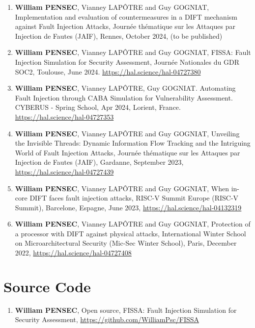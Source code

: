 \begin{enumerate}
    \item \textbf{William PENSEC}, Vianney LAPÔTRE and Guy GOGNIAT, Implementation and evaluation of countermeasures in a DIFT mechanism against Fault Injection Attacks, Journée thématique sur les Attaques par Injection de Fautes (JAIF), Rennes, October 2024, (to be published)
    \item \textbf{William PENSEC}, Vianney LAPÔTRE and Guy GOGNIAT, FISSA: Fault Injection Simulation for Security Assessment, Journée Nationales du GDR SOC2, Toulouse, June 2024. \url{https://hal.science/hal-04727380}
    \item \textbf{William PENSEC}, Vianney LAPÔTRE, Guy GOGNIAT. Automating Fault Injection through CABA Simulation for Vulnerability Assessment. CYBERUS - Spring School, Apr 2024, Lorient, France. \url{https://hal.science/hal-04727353}
    \item \textbf{William PENSEC}, Vianney LAPÔTRE and Guy GOGNIAT, Unveiling the Invisible Threads: Dynamic Information Flow Tracking and the Intriguing World of Fault Injection Attacks, Journée thématique sur les Attaques par Injection de Fautes (JAIF), Gardanne, September 2023, \url{https://hal.science/hal-04727439}
    \item \textbf{William PENSEC}, Vianney LAPÔTRE and Guy GOGNIAT, When in-core DIFT faces fault injection attacks, RISC-V Summit Europe (RISC-V Summit), Barcelone, Espagne, June 2023, \url{https://hal.science/hal-04132319}
    \item \textbf{William PENSEC}, Vianney LAPÔTRE and Guy GOGNIAT, Protection of a processor with DIFT against physical attacks, International Winter School on Microarchitectural Security (Mic-Sec Winter School), Paris, December 2022, \url{https://hal.science/hal-04727408}
\end{enumerate}
\section{Source Code}

\begin{enumerate}
    \item \textbf{William PENSEC}, Open source, FISSA: Fault Injection Simulation for Security Assessment, \url{https://github.com/WilliamPsc/FISSA}
\end{enumerate}
